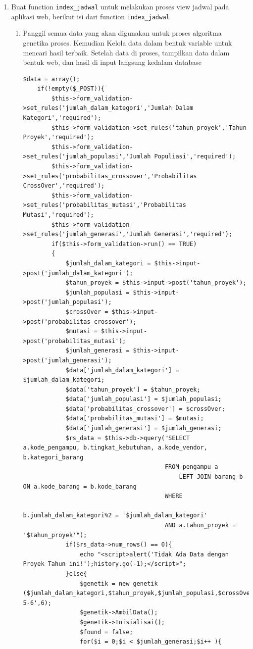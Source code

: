 \begin{enumerate}
	\item Buat function \verb|index_jadwal| untuk melakukan proses view jadwal pada aplikasi web, berikut isi dari function \verb|index_jadwal|
        \begin{enumerate}
            \item Panggil semua data yang akan digunakan untuk proses algoritma genetika proses. Kemudian Kelola data dalam bentuk variable untuk mencari hasil terbaik. Setelah data di proses, tampilkan data dalam bentuk web, dan hasil di input langsung kedalam database
\begin{lstlisting}
$data = array();
	if(!empty($_POST)){
		$this->form_validation->set_rules('jumlah_dalam_kategori','Jumlah Dalam Kategori','required');
		$this->form_validation->set_rules('tahun_proyek','Tahun Proyek','required');
		$this->form_validation->set_rules('jumlah_populasi','Jumlah Populiasi','required');
		$this->form_validation->set_rules('probabilitas_crossover','Probabilitas CrossOver','required');
		$this->form_validation->set_rules('probabilitas_mutasi','Probabilitas Mutasi','required');
		$this->form_validation->set_rules('jumlah_generasi','Jumlah Generasi','required');
		if($this->form_validation->run() == TRUE)
		{				
			$jumlah_dalam_kategori = $this->input->post('jumlah_dalam_kategori');
			$tahun_proyek = $this->input->post('tahun_proyek');
			$jumlah_populasi = $this->input->post('jumlah_populasi');
			$crossOver = $this->input->post('probabilitas_crossover');
			$mutasi = $this->input->post('probabilitas_mutasi');
			$jumlah_generasi = $this->input->post('jumlah_generasi');
			$data['jumlah_dalam_kategori'] = $jumlah_dalam_kategori;
			$data['tahun_proyek'] = $tahun_proyek;
			$data['jumlah_populasi'] = $jumlah_populasi;
			$data['probabilitas_crossover'] = $crossOver;
			$data['probabilitas_mutasi'] = $mutasi;
			$data['jumlah_generasi'] = $jumlah_generasi;
		    $rs_data = $this->db->query("SELECT a.kode_pengampu, b.tingkat_kebutuhan, a.kode_vendor, b.kategori_barang
										FROM pengampu a
											LEFT JOIN barang b ON a.kode_barang = b.kode_barang
										WHERE 
											b.jumlah_dalam_kategori%2 = '$jumlah_dalam_kategori'
										AND a.tahun_proyek = '$tahun_proyek'");
			if($rs_data->num_rows() == 0){
				echo "<script>alert('Tidak Ada Data dengan Proyek Tahun ini!');history.go(-1);</script>";
			}else{
				$genetik = new genetik ($jumlah_dalam_kategori,$tahun_proyek,$jumlah_populasi,$crossOver,$mutasi,5,'4-5-6',6);
				$genetik->AmbilData();
				$genetik->Inisialisai();
				$found = false;
				for($i = 0;$i < $jumlah_generasi;$i++ ){

\end{lstlisting}
\end{enumerate}
\end{enumerate}
